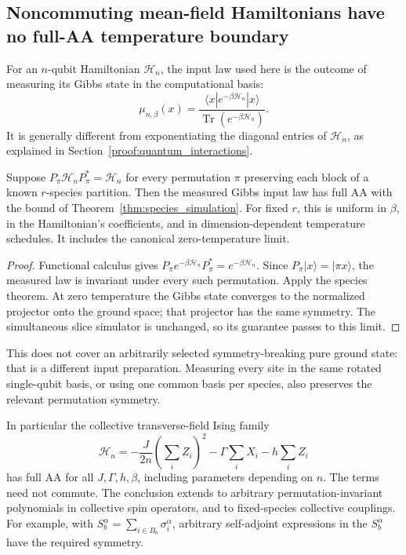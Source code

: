 \subsection{Noncommuting mean-field Hamiltonians have no full-AA temperature boundary}
\label{threshold_physics:quantum_symmetry}

For an \(n\)-qubit Hamiltonian \(\mathcal H_n\), the input law used here
is the outcome of measuring its Gibbs state in the computational basis:
\[
 \mu_{n,\beta}(x)=
 \frac{\langle x|e^{-\beta\mathcal H_n}|x\rangle}
 {\operatorname{Tr}(e^{-\beta\mathcal H_n})}.
\]
It is generally different from exponentiating the diagonal entries of
\(\mathcal H_n\), as explained in Section~\ref{proof:quantum_interactions}.

\begin{corollary}
\label{cor:quantum_species}
Suppose \(P_\pi\mathcal H_nP_\pi^*=\mathcal H_n\) for every permutation
\(\pi\) preserving each block of a known \(r\)-species partition. Then
the measured Gibbs input law has full AA with the bound of
Theorem~\ref{thm:species_simulation}. For fixed \(r\), this is uniform in
\(\beta\), in the Hamiltonian's coefficients, and in dimension-dependent
temperature schedules. It includes the canonical zero-temperature limit.
\end{corollary}

\begin{proof}
Functional calculus gives
\(P_\pi e^{-\beta\mathcal H_n}P_\pi^*=e^{-\beta\mathcal H_n}\).
Since \(P_\pi|x\rangle=|\pi x\rangle\), the measured law is invariant
under every such permutation. Apply the species theorem. At zero
temperature the Gibbs state converges to the normalized projector onto
the ground space; that projector has the same symmetry. The simultaneous
slice simulator is unchanged, so its guarantee passes to this limit.
\end{proof}

This does not cover an arbitrarily selected symmetry-breaking pure
ground state: that is a different input preparation. Measuring every
site in the same rotated single-qubit basis, or using one common basis
per species, also preserves the relevant permutation symmetry.

In particular the collective transverse-field Ising family
\[
 \mathcal H_n=-\frac{J}{2n}\left(\sum_iZ_i\right)^2
              -\Gamma\sum_iX_i-h\sum_iZ_i
\]
has full AA for all \(J,\Gamma,h,\beta\), including parameters depending
on \(n\). The terms need not commute. The conclusion extends to arbitrary
permutation-invariant polynomials in collective spin operators, and to
fixed-species collective couplings. For example, with
\(S_b^\alpha=\sum_{i\in B_b}\sigma_i^\alpha\), arbitrary self-adjoint
expressions in the \(S_b^\alpha\) have the required symmetry.

